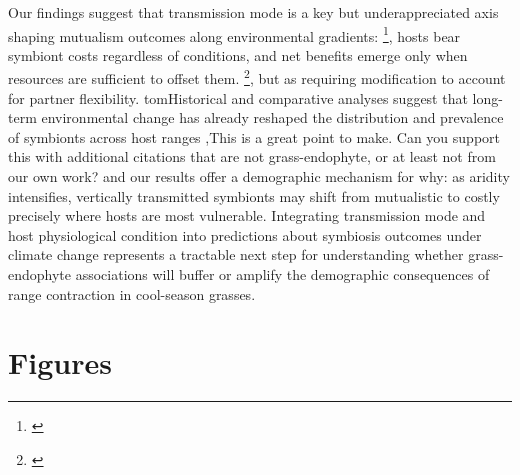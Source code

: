 \documentclass[12pt]{article}\usepackage[]{graphicx}\usepackage[dvipsnames]{xcolor}
\newcommand{\tom}[2]{{\color{red}{#1}}\footnote{\textit{\color{red}{#2}}}}
\begin{document}
Our findings suggest that transmission mode is a key but underappreciated axis shaping mutualism outcomes along environmental gradients: \tom{because vertically transmitted 
endophytes cannot be shed}{This is not strictly true. Many coral symbionts are vertically inherited, yet they can be expelled. So I don't think the ``underappreciated axis'' is transmission mode per se, but rather the lability of the interaction regarding whether or not hosts can expel their symbionts when they become costs.}, hosts bear symbiont costs regardless of conditions, and net benefits emerge only when resources are sufficient to offset them. \tom{This reframes SGH not as inapplicable to symbioses}{I think it is too strong to say that the SGH is inapplicable to symbioses. Instead, I would say that it needs to be applied with some nuance. }, but as requiring modification to account for partner flexibility.
tom{Historical and comparative analyses suggest that long-term environmental change has already reshaped the distribution and prevalence of symbionts across host ranges \citep{fowler2025increasing},}{This is a great point to make. Can you support this with additional citations that are not grass-endophyte, or at least not from our own work?} and our results offer a demographic mechanism for why: as aridity intensifies, vertically transmitted symbionts may shift from mutualistic to costly precisely where hosts are most vulnerable. 
Integrating transmission mode and host physiological condition into predictions about symbiosis outcomes under climate change represents a tractable next step for understanding whether grass-endophyte associations will buffer or amplify the demographic consequences of range contraction in cool-season grasses.

\newpage
%



\clearpage
\section*{Figures}
\end{document}
